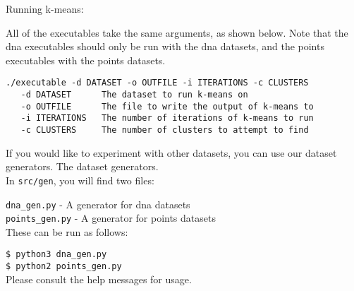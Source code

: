 \documentclass[12pt]{article}
\begin{document}
Running k-means:

All of the executables take the same arguments, as shown below. Note that the dna executables should only be run with the dna datasets, and the points executables with the points datasets.

\begin{verbatim}
./executable -d DATASET -o OUTFILE -i ITERATIONS -c CLUSTERS
   -d DATASET      The dataset to run k-means on
   -o OUTFILE      The file to write the output of k-means to
   -i ITERATIONS   The number of iterations of k-means to run
   -c CLUSTERS     The number of clusters to attempt to find
 \end{verbatim}

 If you would like to experiment with other datasets, you can use our dataset generators. The dataset generators.\\


 In \texttt{src/gen}, you will find two files: 


 \texttt{dna\_gen.py} - A generator for dna datasets \\
 \texttt{points\_gen.py} - A generator for points datasets \\


 These can be run as follows:


 \texttt{\$ python3 dna\_gen.py} \\
 \texttt{\$ python2 points\_gen.py} \\

 Please consult the help messages for usage.
\end{document}
